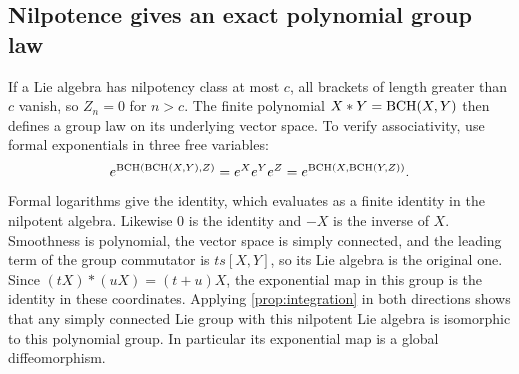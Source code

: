 \subsection{Nilpotence gives an exact polynomial group law}\label{sec:nilpotent}
If a Lie algebra has nilpotency class at most $c$, all brackets of length greater than $c$ vanish, so $Z_n=0$ for $n>c$. The finite polynomial $X*Y=\operatorname{BCH}(X,Y)$ then defines a group law on its underlying vector space. To verify associativity, use formal exponentials in three free variables:
\[
 e^{\operatorname{BCH}(\operatorname{BCH}(X,Y),Z)}=e^Xe^Ye^Z
 =e^{\operatorname{BCH}(X,\operatorname{BCH}(Y,Z))}.
\]
Formal logarithms give the identity, which evaluates as a finite identity in the nilpotent algebra. Likewise $0$ is the identity and $-X$ is the inverse of $X$. Smoothness is polynomial, the vector space is simply connected, and the leading term of the group commutator is $ts[X,Y]$, so its Lie algebra is the original one. Since $(tX)*(uX)=(t+u)X$, the exponential map in this group is the identity in these coordinates. Applying \cref{prop:integration} in both directions shows that any simply connected Lie group with this nilpotent Lie algebra is isomorphic to this polynomial group. In particular its exponential map is a global diffeomorphism.
